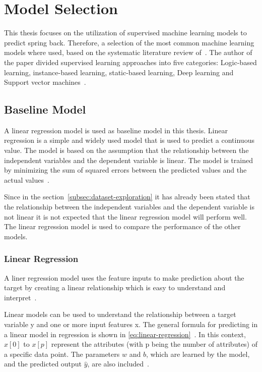 \section{Model Selection}\label{sec:model-selection}
This thesis focuses on the utilization of supervised machine learning models to predict
spring back.
Therefore, a selection of the most common machine learning models where used, based on
the systematic literature review of~\cite{
    dridi2021supervised}.
The author of the paper divided supervised learning approaches into five categories:
Logic-based learning, instance-based learning, static-based learning, Deep learning and
Support vector machines~\cite[p. 8]{dridi2021supervised}.

\subsection{Baseline Model}\label{subsec:regression-models}
A linear regression model is used as baseline model in this thesis.
Linear regression is a simple and widely used model that is used to predict a
continuous value.
The model is based on the assumption that the relationship between the independent
variables and the dependent variable is linear.
The model is trained by minimizing the sum of squared errors between the predicted
values and the actual values~\cite[p. 47--68]{muller_introductionmachinelearning_2016}.

Since in the section~\ref{subsec:dataset-exploration} it has already been stated that the
relationship between the independent variables and the dependent variable is not linear
it is not expected that the linear regression model will perform well.
The linear regression model is used to compare the performance of the other models.

\subsubsection{Linear Regression}\label{subsec:linear-regression}
A liner regression model uses the feature inputs to make prediction about the
target by creating a linear relationship which is easy to understand and
interpret~\cite[p. 37]{molnar2020interpretable}.

Linear models can be used to understand the relationship between a target variable y
and one or more input features x.
The general formula for predicting in a linear model in regression is shown in
\ref{eq:linear-regression}~\cite[p.
45]{muller_introductionmachinelearning_2016}.
In this context, $x[0]$ to $x[p]$ represent the attributes (with p being the number of
attributes) of a specific data point.
The parameters $w$ and $b$, which are learned by the model, and the predicted output $\hat{y}$,
are also included~\cite[p. 45]{muller_introductionmachinelearning_2016}.

